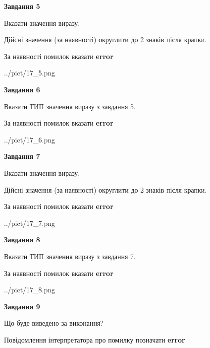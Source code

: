 \documentclass[11pt, ukrainian]{article}
\begin{document}
{\begin {large}
{\begin {center}\textbf{Завдання 5}\end {center}}\par
Вказати значення виразу. \par
Дійсні значення (за наявності) округлити до 2 знаків після крапки. \par
За наявності помилок вказати \textbf{error}

\begin{center}
	{../pict/17_5.png}
\end{center}
\newpage

{\begin {center}\textbf{Завдання 6}\end {center}}\par
Вказати ТИП значення виразу з завдання 5. \par
За наявності помилок вказати \textbf{error}

\begin{center}
	{../pict/17_6.png}
\end{center}
\newpage

{\begin {center}\textbf{Завдання 7}\end {center}}\par
Вказати значення виразу. \par
Дійсні значення (за наявності) округлити до 2 знаків після крапки. \par
За наявності помилок вказати \textbf{error}

\begin{center}
	{../pict/17_7.png}
\end{center}
\newpage

{\begin {center}\textbf{Завдання 8}\end {center}}\par
Вказати ТИП значення виразу з завдання 7. \par
За наявності помилок вказати \textbf{error}

\begin{center}
	{../pict/17_8.png}
\end{center}
\newpage

{\begin {center}\textbf{Завдання 9}\end {center}}\par
Що буде виведено за виконання? \par
Повідомлення інтерпретатора про помилку позначати \textbf{error}


\end{large}}
\end{document}

